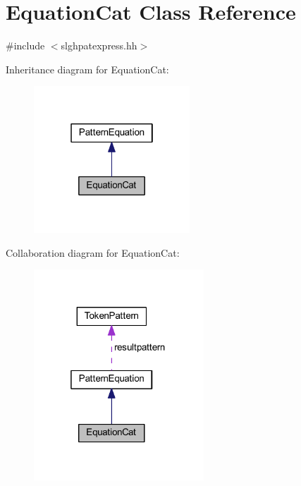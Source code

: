 \hypertarget{class_equation_cat}{}\section{Equation\+Cat Class Reference}
\label{class_equation_cat}


{\ttfamily \#include $<$slghpatexpress.\+hh$>$}



Inheritance diagram for Equation\+Cat\+:
\nopagebreak
\begin{figure}[H]
\begin{center}
\leavevmode
\includegraphics[width=166pt]{class_equation_cat__inherit__graph}
\end{center}
\end{figure}


Collaboration diagram for Equation\+Cat\+:
\nopagebreak
\begin{figure}[H]
\begin{center}
\leavevmode
\includegraphics[width=181pt]{class_equation_cat__coll__graph}
\end{center}
\end{figure}
